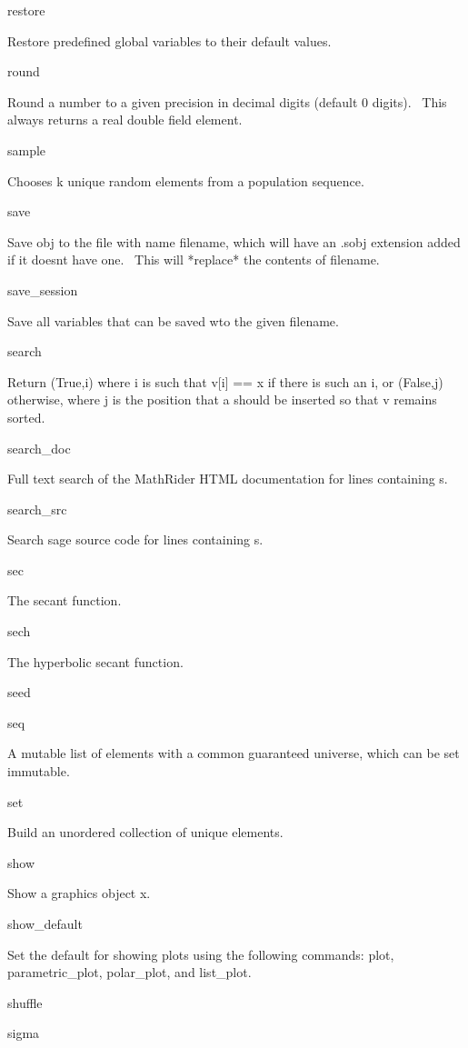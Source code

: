 \documentclass[12pt,twoside]{book}
\begin{document}
restore

Restore predefined global variables to their default values.

round

Round a number to a given precision in decimal digits (default 0
digits). \ This always returns a real double field element.

sample

Chooses k unique random elements from a population sequence.

save

Save obj to the file with name filename, which will have an .sobj
extension added if it doesn{\textquotesingle}t have one. \ This will
*replace* the contents of filename.

save\_session

Save all variables that can be saved wto the given filename.

search

Return (True,i) where i is such that v[i] == x if there is such an i, or
(False,j) otherwise, where j is the position that a should be inserted
so that v remains sorted.

search\_doc

Full text search of the MathRider HTML documentation for lines
containing s.

search\_src

Search sage source code for lines containing s.

sec

The secant function.

sech

The hyperbolic secant function.

seed


\bigskip

seq

A mutable list of elements with a common guaranteed universe, which can
be set immutable.

set

Build an unordered collection of unique elements.

show

Show a graphics object x.

show\_default

Set the default for showing plots using the following commands: plot,
parametric\_plot, polar\_plot, and list\_plot.

shuffle


\bigskip

sigma
\end{document}
